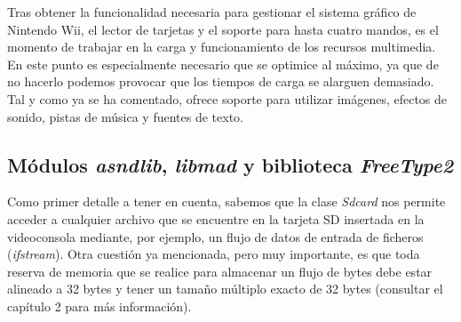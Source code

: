 



Tras obtener la funcionalidad necesaria para gestionar el sistema gráfico de Nintendo Wii, el lector de tarjetas y el soporte para hasta cuatro mandos, es el momento de trabajar en la carga y funcionamiento de los recursos multimedia. En este punto es especialmente necesario que se optimice al máximo, ya que de no hacerlo podemos provocar que los tiempos de carga se alarguen demasiado.\\

Tal y como ya se ha comentado,  ofrece soporte para utilizar imágenes, efectos de sonido, pistas de música y fuentes de texto.

\subsection{Módulos \emph{asndlib}, \emph{libmad} y biblioteca \emph{FreeType2}}

Como primer detalle a tener en cuenta, sabemos que la clase \emph{Sdcard} nos permite acceder a cualquier archivo que se encuentre en la tarjeta SD insertada en la videoconsola mediante, por ejemplo, un flujo de datos de entrada de ficheros (\emph{ifstream}). Otra cuestión ya mencionada, pero muy importante, es que toda reserva de memoria que se realice para almacenar un flujo de bytes debe estar alineado a 32 bytes y tener un tamaño múltiplo exacto de 32 bytes (consultar el capítulo 2 para más información).\\

